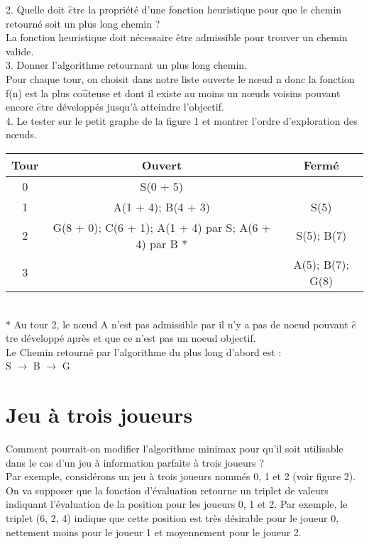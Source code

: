 \documentclass[12pt,a4paper, france]{article}
\newcommand\tab[1][1cm]{\hspace*{#1}}
\begin{document}
\tab 2. Quelle doit ${\hat{e}}$tre la propri\'et\'e d\textquoteright une fonction heuristique pour que le chemin retourn\'e soit un plus long chemin ? \\

La fonction heuristique doit nécessaire être admissible pour trouver un chemin valide. \\

\tab 3. Donner l\textquoteright algorithme retournant un plus long chemin. \\

Pour chaque tour, on choisit dans notre liste ouverte le nœud n donc la fonction f(n) est la plus co${\hat{u}}$teuse et dont il existe au moins un nœuds voisins pouvant encore ${\hat{e}}$tre d\'evelopp\'es jusqu\textquoteright \`a atteindre l'objectif. \\

\tab 4. Le tester sur le petit graphe de la figure 1 et montrer l\textquoteright ordre d\textquoteright exploration des nœuds. \\

\begin{tabular}{ | c || *{2}{c|}}
    \hline
    Tour & Ouvert & Ferm\'e  \\
    \hline
    \hline
    0 & S(0 + 5) & \\
    \hline
    1 & A(1 + 4); B(4 + 3) & S(5)\\
    \hline
    2 & G(8 + 0); C(6 + 1); A(1 + 4) par S; A(6 + 4) par B *& S(5); B(7)\\
    \hline
    3 & & A(5); B(7); G(8) \\
    \hline
\end{tabular} \\
* Au tour 2, le nœud A n'est pas admissible par il n'y a pas de noeud pouvant ${\hat{e}}$tre d\'evelopp\'e apr\`es et que ce n\textquoteright est pas un noeud objectif.\\

Le Chemin retourn\'e par l\textquoteright algorithme du plus long d\textquoteright abord est : \\
\tab \tab \tab S ${\rightarrow}$ B ${\rightarrow}$ G\\


\section{Jeu à trois joueurs}

Comment pourrait-on modifier l\textquoteright algorithme minimax pour qu\textquoteright il soit utilisable dans le cas d\textquoteright un jeu \`a information parfaite \`a trois joueurs ? \\
Par exemple, consid\'erons un jeu \`a trois joueurs nomm\'es 0, 1 et 2 (voir figure 2). On va supposer que la fonction d\textquoteright \'evaluation retourne un triplet de valeurs indiquant l\textquoteright \'evaluation de la position pour les joueurs 0, 1 et 2. Par exemple, le triplet (6, 2, 4) indique que cette position est tr\`es d\'esirable pour le joueur 0, nettement moins pour le joueur 1 et moyennement pour le joueur 2.\\
\end{document}
